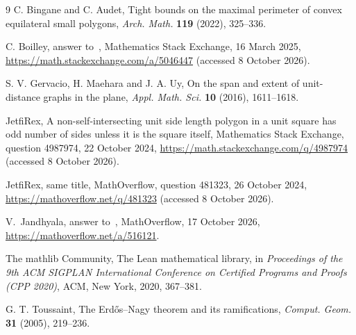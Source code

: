 \documentclass[11pt]{article}
\theoremstyle{remark}
\begin{document}
\begin{thebibliography}{9}
C. Bingane and C. Audet, Tight bounds on the maximal perimeter of convex equilateral small
polygons, \emph{Arch. Math.} \textbf{119} (2022), 325--336.

C. Boilley, answer to~\cite{JetfiRexMSE}, Mathematics Stack Exchange, 16 March 2025,
\url{https://math.stackexchange.com/a/5046447} (accessed 8 October 2026).

S. V. Gervacio, H. Maehara and J. A. Uy, On the span and extent of unit-distance graphs in
the plane, \emph{Appl. Math. Sci.} \textbf{10} (2016), 1611--1618.

JetfiRex, A non-self-intersecting unit side length polygon in a unit square has odd number
of sides unless it is the square itself, Mathematics Stack Exchange, question 4987974,
22 October 2024, \url{https://math.stackexchange.com/q/4987974} (accessed 8 October 2026).

JetfiRex, same title, MathOverflow, question 481323, 26 October 2024,
\url{https://mathoverflow.net/q/481323} (accessed 8 October 2026).

V.~Jandhyala, answer to~\cite{JetfiRexMO}, MathOverflow, 17 October 2026,
\url{https://mathoverflow.net/a/516121}.

The mathlib Community, The Lean mathematical library, in \emph{Proceedings of the 9th ACM
SIGPLAN International Conference on Certified Programs and Proofs (CPP 2020)}, ACM, New
York, 2020, 367--381.

G. T. Toussaint, The Erd\H{o}s--Nagy theorem and its ramifications, \emph{Comput. Geom.}
\textbf{31} (2005), 219--236.
\end{thebibliography}
\end{document}
